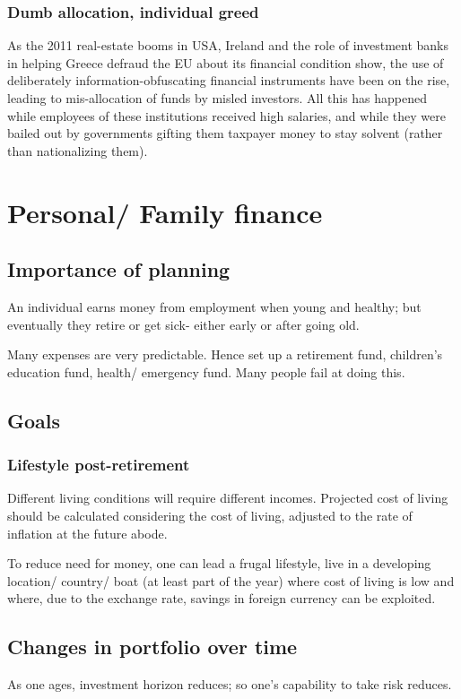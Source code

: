 \documentclass[oneside, article]{memoir}
\begin{document}
\subsubsection{Dumb allocation, individual greed}
As the 2011 real-estate booms in USA, Ireland and the role of investment banks in helping Greece defraud the EU about its financial condition show, the use of deliberately information-obfuscating financial instruments have been on the rise, leading to mis-allocation of funds by misled investors. All this has happened while employees of these institutions received high salaries, and while they were bailed out by governments gifting them taxpayer money to stay solvent (rather than nationalizing them).

\section{Personal/ Family finance}
\subsection{Importance of planning}
An individual earns money from employment when young and healthy; but eventually they retire or get sick- either early or after going old.

Many expenses are very predictable. Hence set up a retirement fund, children's education fund, health/ emergency fund. Many people fail at doing this.

\subsection{Goals}
\subsubsection{Lifestyle post-retirement}
Different living conditions will require different incomes. Projected cost of living should be calculated considering the cost of living, adjusted to the rate of inflation at the future abode.

To reduce need for money, one can lead a frugal lifestyle, live in a developing location/ country/ boat (at least part of the year) where cost of living is low and where, due to the exchange rate, savings in foreign currency can be exploited.

\subsection{Changes in portfolio over time}
As one ages, investment horizon reduces; so one's capability to take risk reduces.
\end{document}

